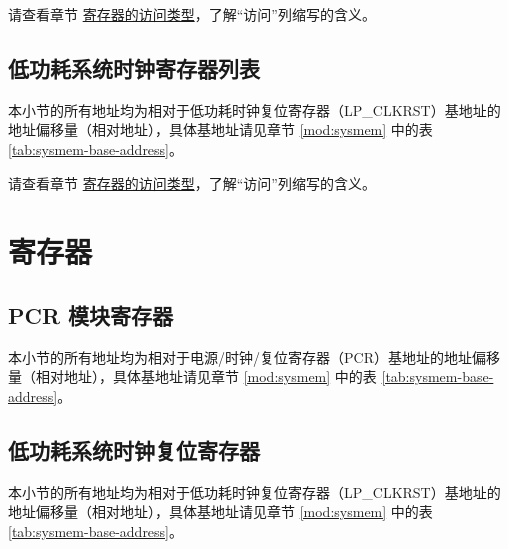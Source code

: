 \documentclass[main\_\_CN.tex]{subfiles}
\begin{document}
请查看章节 \hyperref[glossary-access-types]{寄存器的访问类型}，了解“访问”列缩写的含义。



\subsection{低功耗系统时钟寄存器列表}
\label{subsec:resclk-lp-reg-summ}
本小节的所有地址均为相对于低功耗时钟复位寄存器（LP\_CLKRST）基地址的地址偏移量（相对地址），具体基地址请见章节 \ref{mod:sysmem} \textit{} 中的表 \ref{tab:sysmem-base-address}。

请查看章节 \hyperref[glossary-access-types]{寄存器的访问类型}，了解“访问”列缩写的含义。






\newpage
\section{寄存器}

\subsection{PCR 模块寄存器}


本小节的所有地址均为相对于电源/时钟/复位寄存器（PCR）基地址的地址偏移量（相对地址），具体基地址请见章节 \ref{mod:sysmem} \textit{} 中的表 \ref{tab:sysmem-base-address}。





\subsection{低功耗系统时钟复位寄存器}


本小节的所有地址均为相对于低功耗时钟复位寄存器（LP\_CLKRST）基地址的地址偏移量（相对地址），具体基地址请见章节 \ref{mod:sysmem} \textit{} 中的表 \ref{tab:sysmem-base-address}。



\end{document}
